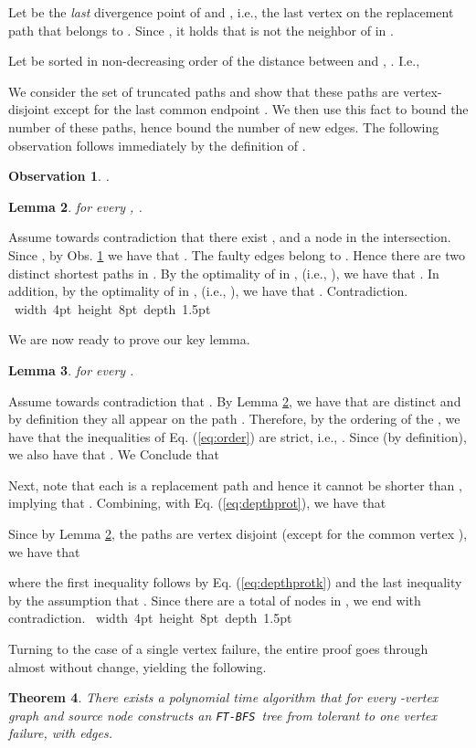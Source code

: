 \documentclass[12pt]{article}
\newtheorem{theorem}{Theorem}[section]
\newtheorem{lemma}[theorem]{Lemma}
\newtheorem{observation}[theorem]{Observation}
\def\Proof{\par\noindent{\bf Proof:~}}
\def\blackslug{\hbox{\hskip 1pt \vrule width 4pt height 8pt
    depth 1.5pt \hskip 1pt}}
\def\QED{\quad\blackslug\lower 8.5pt\null\par}
\def\FTBFS{\mbox{\tt FT-BFS}}
\begin{document}
Let  be the \emph{last} divergence point of
 and , i.e., the last vertex on the
replacement path  that belongs to
.
Since ,
it holds that  is not the neighbor of  in .
\par Let  be sorted in non-decreasing order
of the distance between  and , .
I.e.,

We consider the set of truncated paths  and show that these paths are vertex-disjoint except for the last common endpoint .
We then use this fact to bound the number of these paths, hence bound the number  of new edges. The following observation follows immediately by the definition of .
\begin{observation}
\label{obs:notinpath}
.
\end{observation}
\begin{lemma}
\label{cl:disjointpathmulti}
 for every
, .
\end{lemma}
\Proof
Assume towards contradiction that there exist , and a node
 in the intersection.
Since , by Obs. \ref{obs:notinpath} we have that .
The faulty edges  belong to .
Hence there are two distinct  shortest paths in .
By the optimality of  in ,
(i.e., ), we have that
.
In addition, by the optimality of
 in , (i.e., ),
we have that .
Contradiction.
\QED
We are now ready to prove our key lemma.
\begin{lemma}
\label{lem:upper_bound}
 for every .
\end{lemma}
\Proof
Assume towards contradiction that .
By Lemma \ref{cl:disjointpathmulti}, we have that  are distinct and by definition they all appear on the path .
Therefore, by the ordering of the , we have that the
inequalities of Eq. (\ref{eq:order}) are strict, i.e.,
.
Since  (by definition),
we also have that
. We Conclude that

Next, note that each  is a replacement  path and hence it cannot be shorter than , implying that . Combining, with Eq. (\ref{eq:depthprot}), we have that

Since by Lemma \ref{cl:disjointpathmulti}, the paths  are vertex disjoint (except for the common vertex ), we have that

where the first inequality follows by Eq. (\ref{eq:depthprotk}) and the last inequality by the assumption that .
Since there are a total of  nodes in , we end with contradiction.
\QED

Turning to the case of a single vertex failure, the entire
proof goes through almost without change, yielding the following.
\begin{theorem}
\label{thm:vertexonef}
There exists a polynomial time algorithm that for every -vertex graph
and source node  constructs  an \FTBFS\ tree from 
tolerant to one vertex failure,
with  edges.
\end{theorem}
\end{document}
